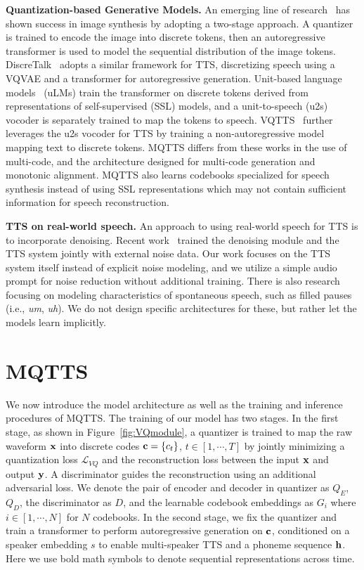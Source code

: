 \documentclass[letterpaper]{article}
\begin{document}
\textbf{Quantization-based Generative Models.}
An emerging line of research~\cite{pmlr-v139-ramesh21a,Esser_2021_CVPR} has shown success in image synthesis by adopting a two-stage approach.
A quantizer is trained to encode the image into discrete tokens, then an autoregressive transformer is used to model the sequential distribution of the image tokens.
DiscreTalk~\cite{DBLP:journals/corr/abs-2005-05525} adopts a similar framework for TTS, discretizing speech using a VQVAE and a transformer for autoregressive generation.
Unit-based language models~\cite{10.1162/tacl_a_00430} (uLMs) train the transformer on discrete tokens derived from representations of self-supervised (SSL) models, and a unit-to-speech (u2s) vocoder is separately trained to map the tokens to speech.
VQTTS~\cite{du22b_interspeech} further leverages the u2s vocoder for TTS by training a non-autoregressive model mapping text to discrete tokens.
MQTTS differs from these works in the use of multi-code, and the architecture designed for multi-code generation and monotonic alignment.
MQTTS also learns codebooks specialized for speech synthesis instead of using SSL representations which may not contain sufficient information for speech reconstruction.

\textbf{TTS on real-world speech.}
An approach to using real-world speech for TTS is to incorporate denoising.
Recent work~\cite{DBLP:conf/icassp/Zhang00LZQZL21} trained the denoising module and the TTS system jointly with external noise data.
Our work focuses on the TTS system itself instead of explicit noise modeling, and we utilize a simple audio prompt for noise reduction without additional training.
There is also research~\cite{DBLP:journals/corr/abs-2107-02530} focusing on modeling characteristics of spontaneous speech, such as filled pauses (i.e., \textit{um}, \textit{uh}).
We do not design specific architectures for these, but rather let the models learn implicitly.


\section{MQTTS}
\label{sec:model}
We now introduce the model architecture as well as the training and inference procedures of MQTTS.
The training of our model has two stages.
In the first stage, as shown in Figure~\ref{fig:VQmodule}, a quantizer is trained to map the raw waveform $\vb{x}$ into discrete codes $\vb{c}=\{c_t\}$, $t\in [1, \cdots, T]$ by jointly minimizing a quantization loss $\mathcal{L}_{VQ}$ and the reconstruction loss between the input $\vb{x}$ and output $\vb{y}$.
A discriminator  guides the reconstruction using an additional adversarial loss.
We denote the pair of encoder and decoder in quantizer as $Q_E$, $Q_D$, the discriminator as $D$, and the learnable codebook embeddings as $G_i$ where $i\in [1, \cdots, N]$ for $N$ codebooks.
In the second stage, we fix the quantizer and train a transformer to perform autoregressive generation on $\vb{c}$, conditioned on a speaker embedding $s$ to enable multi-speaker TTS and a phoneme sequence $\vb{h}$.
Here we use bold math symbols to denote sequential representations across time.
\end{document}
